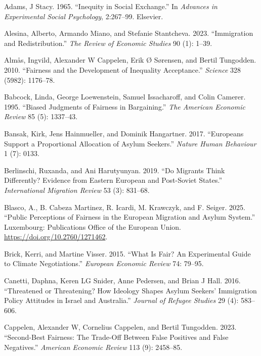 \documentclass[
  12pt,
  a4paper,
]{article}
\newlength{\cslhangindent}
\newenvironment{CSLReferences}[2] %
 {\begin{list}{}{%
  \setlength{\itemindent}{0pt}
  \setlength{\leftmargin}{0pt}
  \setlength{\parsep}{0pt}
  \ifodd #1
   \setlength{\leftmargin}{\cslhangindent}
   \setlength{\itemindent}{-1\cslhangindent}
  \fi
  \setlength{\itemsep}{#2\baselineskip}}}
 {\end{list}}
\begin{document}
\label{refs}
\begin{CSLReferences}{1}{0}
Adams, J Stacy. 1965. {``Inequity in Social Exchange.''} In \emph{Advances in Experimental Social Psychology}, 2:267--99. Elsevier.

Alesina, Alberto, Armando Miano, and Stefanie Stantcheva. 2023. {``Immigration and Redistribution.''} \emph{The Review of Economic Studies} 90 (1): 1--39.

Almås, Ingvild, Alexander W Cappelen, Erik Ø Sørensen, and Bertil Tungodden. 2010. {``Fairness and the Development of Inequality Acceptance.''} \emph{Science} 328 (5982): 1176--78.

Babcock, Linda, George Loewenstein, Samuel Issacharoff, and Colin Camerer. 1995. {``Biased Judgments of Fairness in Bargaining.''} \emph{The American Economic Review} 85 (5): 1337--43.

Bansak, Kirk, Jens Hainmueller, and Dominik Hangartner. 2017. {``Europeans Support a Proportional Allocation of Asylum Seekers.''} \emph{Nature Human Behaviour} 1 (7): 0133.

Berlinschi, Ruxanda, and Ani Harutyunyan. 2019. {``Do Migrants Think Differently? Evidence from Eastern European and Post-Soviet States.''} \emph{International Migration Review} 53 (3): 831--68.

Blasco, A., B. Cabeza Martinez, R. Icardi, M. Krawczyk, and F. Seiger. 2025. {``Public Perceptions of Fairness in the European Migration and Asylum System.''} Luxembourg: Publications Office of the European Union. \url{https://doi.org/10.2760/1271462}.

Brick, Kerri, and Martine Visser. 2015. {``What Is Fair? An Experimental Guide to Climate Negotiations.''} \emph{European Economic Review} 74: 79--95.

Canetti, Daphna, Keren LG Snider, Anne Pedersen, and Brian J Hall. 2016. {``Threatened or Threatening? How Ideology Shapes Asylum Seekers' Immigration Policy Attitudes in Israel and Australia.''} \emph{Journal of Refugee Studies} 29 (4): 583--606.

Cappelen, Alexander W, Cornelius Cappelen, and Bertil Tungodden. 2023. {``Second-Best Fairness: The Trade-Off Between False Positives and False Negatives.''} \emph{American Economic Review} 113 (9): 2458--85.


\end{CSLReferences}
\end{document}
